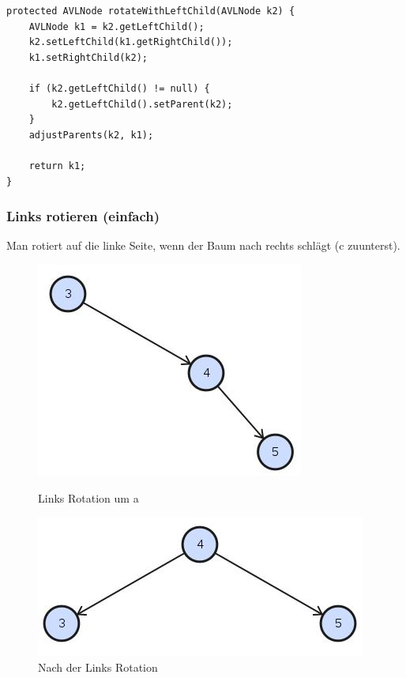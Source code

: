 \begin{lstlisting}[caption=AVL Tree: Single right rotation]
protected AVLNode rotateWithLeftChild(AVLNode k2) {
	AVLNode k1 = k2.getLeftChild();
	k2.setLeftChild(k1.getRightChild());
	k1.setRightChild(k2);

	if (k2.getLeftChild() != null) {
		k2.getLeftChild().setParent(k2);
	}
	adjustParents(k2, k1);

	return k1;
}
\end{lstlisting}

\subsubsection{Links rotieren (einfach)}
Man rotiert auf die linke Seite, wenn der Baum nach rechts schlägt (c zuunterst).
\begin{figure}[h!]
	\centering
	\begin{minipage}[t]{0.4\textwidth}
		\centering
		\includegraphics[width=0.7\linewidth]{images/avl_left_rotation_1}
		\caption{Links Rotation um a}
		\label{fig:trieexample}
	\end{minipage}
	\begin{minipage}[t]{0.4\textwidth}
		\centering
		\includegraphics[width=0.9\linewidth]{images/avl_rotation_final}
		\caption{Nach der Links Rotation}
		\label{fig:searchtreeinsert2}
	\end{minipage}
\end{figure}

